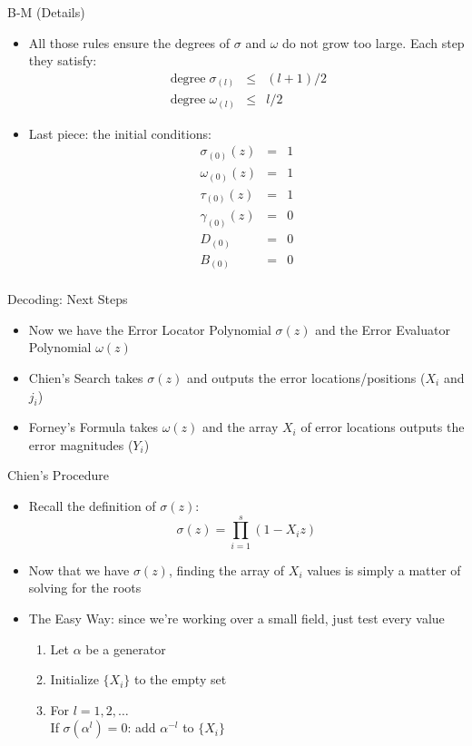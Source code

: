 \documentclass[]{prosper}
\begin{document}
\begin{slide}{B-M (Details)}
\begin{itemize}
    \item All those rules ensure the degrees of $\sigma$ and $\omega$ do not grow too large. Each step they satisfy:
    \begin{eqnarray*}
        \operatorname{degree} \sigma_{(l)} &\le& (l+1)/2 \\
        \operatorname{degree} \omega_{(l)} &\le& l/2
    \end{eqnarray*}
    \item Last piece: the initial conditions:
    \begin{eqnarray*}
        \sigma_{(0)}(z) &=& 1 \\
        \omega_{(0)}(z) &=& 1 \\
        \tau_{(0)}(z)   &=& 1 \\
        \gamma_{(0)}(z) &=& 0 \\
        D_{(0)}         &=& 0 \\
        B_{(0)}         &=& 0 \\
    \end{eqnarray*}
\end{itemize}
\end{slide}

\begin{slide}{Decoding: Next Steps}
\begin{itemize}
    \item Now we have the Error Locator Polynomial $\sigma(z)$ and the Error Evaluator Polynomial $\omega(z)$
    \item Chien's Search takes $\sigma(z)$ and outputs the error locations/positions ($X_i$ and $j_i$)
    \item Forney's Formula takes $\omega(z)$ and the array $X_i$ of error locations outputs the error magnitudes ($Y_i$)
\end{itemize}
\end{slide}

\begin{slide}{Chien's Procedure}
\begin{itemize}
    \item Recall the definition of $\sigma(z)$:
    \[
    \sigma(z) = \prod_{i=1}^s (1 - X_i z)
    \]
    \item Now that we have $\sigma(z)$, finding the array of $X_i$ values is simply a matter of solving for the roots
    \item The Easy Way: since we're working over a small field, just test every value
    \begin{enumerate}
        \item Let $\alpha$ be a generator
        \item Initialize $\{X_i\}$ to the empty set
        \item For $l = 1, 2, \ldots$ \\
            If $\sigma(\alpha^l) = 0$: add $\alpha^{-l}$ to $\{X_i\}$
    \end{enumerate}
\end{itemize}
\end{slide}
\end{document}
